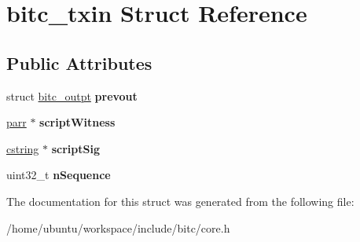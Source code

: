 \hypertarget{structbitc__txin}{\section{bitc\-\_\-txin Struct Reference}
\label{structbitc__txin}
}
\subsection*{Public Attributes}
\begin{DoxyCompactItemize}
\item 
\hypertarget{structbitc__txin_a6caf1bad15db0019f572711d57bb66a0}{struct \hyperlink{structbitc__outpt}{bitc\-\_\-outpt} {\bfseries prevout}}\label{structbitc__txin_a6caf1bad15db0019f572711d57bb66a0}

\item 
\hypertarget{structbitc__txin_aaf2783b6f16dd6d4ed8f57541dc128bc}{\hyperlink{structparr}{parr} $\ast$ {\bfseries script\-Witness}}\label{structbitc__txin_aaf2783b6f16dd6d4ed8f57541dc128bc}

\item 
\hypertarget{structbitc__txin_a4f1cee77a0a2ed481d430617f9aae13b}{\hyperlink{structcstring}{cstring} $\ast$ {\bfseries script\-Sig}}\label{structbitc__txin_a4f1cee77a0a2ed481d430617f9aae13b}

\item 
\hypertarget{structbitc__txin_a8e73a556bced4ef996b974604a4f1e86}{uint32\-\_\-t {\bfseries n\-Sequence}}\label{structbitc__txin_a8e73a556bced4ef996b974604a4f1e86}

\end{DoxyCompactItemize}


The documentation for this struct was generated from the following file\-:\begin{DoxyCompactItemize}
\item 
/home/ubuntu/workspace/include/bitc/core.\-h\end{DoxyCompactItemize}
